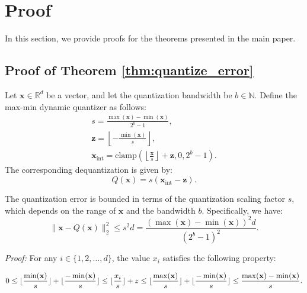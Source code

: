 \newpage
\appendix
\onecolumn

\section{Proof}
\label{appsec:proof}
In this section, we provide proofs for the theorems presented in the main paper.
\subsection{Proof of Theorem \ref{thm:quantize_error}}
\label{proof:quantize_error}

\begin{theorem}
Let \( \mathbf{x} \in \mathbb{R}^d \) be a vector, and let the quantization bandwidth be \( b \in \mathbb{N} \). Define the max-min dynamic quantizer as follows:
\begin{gather}
\label{eqn:s}
    s  = \frac{\max(\mathbf{x}) - \min(\mathbf{x})}{2^b - 1}, \\
    \mathbf{z}  = \left\lfloor -\frac{\min(\mathbf{x})}{s} \right\rfloor, \\
    \mathbf{x}_\text{int}  = \text{clamp}(\left\lfloor \frac{\mathbf{x}}{s} \right\rfloor + \mathbf{z}, 0, 2^b-1).
\end{gather}
The corresponding dequantization is given by:
\begin{equation}
    Q(\mathbf{x}) = s (\mathbf{x}_\text{int} - \mathbf{z}).
\end{equation}

The quantization error is bounded in terms of the quantization scaling factor \( s \), which depends on the range of \( \mathbf{x} \) and the bandwidth \( b \). Specifically, we have:
\begin{equation}
    \|\mathbf{x} - Q(\mathbf{x})\|_2^2 \leq {s^2d} = \frac{(\max(\mathbf{x}) - \min(\mathbf{x}))^2d}{(2^b - 1)^2}.
\end{equation}
\end{theorem}


\textit{Proof:} For any \( i \in \{1, 2, \dots, d\} \), the value \( x_i \) satisfies the following property:

\begin{align}
    0 \leq \lfloor \frac{\min({\mathbf{x}})}{s} \rfloor + \lfloor \frac{-\min({\mathbf{x}})}{s} \rfloor 
    \leq \lfloor \frac{x_i}{s} \rfloor + z 
    \leq \lfloor \frac{\max({\mathbf{x}})}{s} \rfloor + \lfloor \frac{-\min({\mathbf{x}})}{s} \rfloor 
    \leq \frac{\max({\mathbf{x}}) - \min({\mathbf{x}})}{s}.
\end{align}

